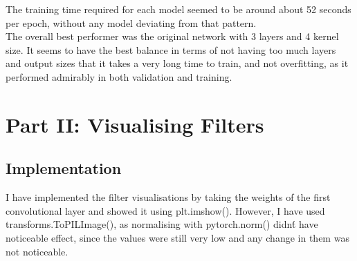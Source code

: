 \documentclass{article}
\begin{document}
    The training time required for each model seemed to be around about 52 seconds per epoch, without any model deviating from that pattern.\\

    The overall best performer was the original network with 3 layers and 4 kernel size. It seems to have the best balance in terms of not having too much layers and output sizes that it takes a very long time to train, and not overfitting, as it performed admirably in both validation and training.

    \section{Part II: Visualising Filters}

    \subsection{Implementation}

    I have implemented the filter visualisations by taking the weights of the first convolutional layer and showed it using plt.imshow(). However, I have used transforms.ToPILImage(), as normalising with pytorch.norm() didn\'t have noticeable effect, since the values were still very low and any change in them was not noticeable.
\end{document}
